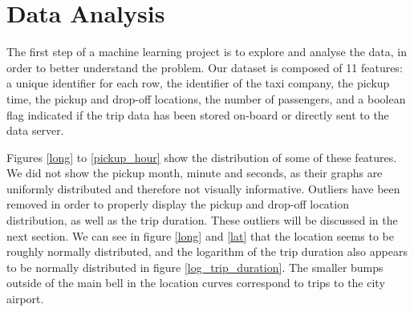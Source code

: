 \documentclass[a4paper]{article}
\begin{document}
\section{Data Analysis}
The first step of a machine learning project is to explore and analyse the data,
in order to better understand the problem. Our dataset is composed of 11
features: a unique identifier for each row, the identifier of the taxi company,
the pickup time, the pickup and drop-off locations, the number of passengers,
and a boolean flag indicated if the trip data has been stored on-board or
directly sent to the data server.

Figures \ref{long} to \ref{pickup_hour} show the distribution of some of these
features. We did not show the pickup month, minute and seconds, as their graphs
are uniformly distributed and therefore not visually informative. Outliers have
been removed in order to properly display the pickup and drop-off location
distribution, as well as the trip duration. These outliers will be discussed in
the next section. We can see in figure \ref{long} and \ref{lat} that the
location seems to be roughly normally distributed, and the logarithm of the trip
duration also appears to be normally distributed in figure
\ref{log_trip_duration}. The smaller bumps outside of the main bell in the
location curves correspond to trips to the city airport.
\end{document}
